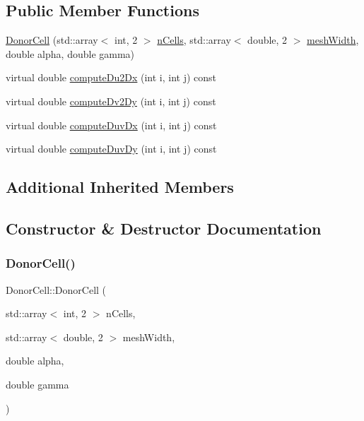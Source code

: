 \subsection*{Public Member Functions}
\begin{DoxyCompactItemize}
\item 
\mbox{\hyperlink{classDonorCell_acea7bc69414ae6534ffc93960e047704}{Donor\+Cell}} (std\+::array$<$ int, 2 $>$ \mbox{\hyperlink{classStaggeredGrid_af37816ccb2c46e4a514dedac261897bf}{n\+Cells}}, std\+::array$<$ double, 2 $>$ \mbox{\hyperlink{classStaggeredGrid_a330856d4efe952771daf0753ef84068e}{mesh\+Width}}, double alpha, double gamma)
\item 
virtual double \mbox{\hyperlink{classDonorCell_a191338f4c9d03f2fcf202ab865f28446}{compute\+Du2\+Dx}} (int i, int j) const
\item 
virtual double \mbox{\hyperlink{classDonorCell_a7b3026b85f60709b52742cb672af81c1}{compute\+Dv2\+Dy}} (int i, int j) const
\item 
virtual double \mbox{\hyperlink{classDonorCell_a15d34de5bfaf3ef3bb8713f7b5474b56}{compute\+Duv\+Dx}} (int i, int j) const
\item 
virtual double \mbox{\hyperlink{classDonorCell_a9255ed63d7d334c01be6204fcd457699}{compute\+Duv\+Dy}} (int i, int j) const
\end{DoxyCompactItemize}
\subsection*{Additional Inherited Members}


\subsection{Constructor \& Destructor Documentation}
\mbox{\label{classDonorCell_acea7bc69414ae6534ffc93960e047704}} 
\subsubsection{\texorpdfstring{DonorCell()}{DonorCell()}}
{\footnotesize\ttfamily Donor\+Cell\+::\+Donor\+Cell (\begin{DoxyParamCaption}\item[{std\+::array$<$ int, 2 $>$}]{n\+Cells,  }\item[{std\+::array$<$ double, 2 $>$}]{mesh\+Width,  }\item[{double}]{alpha,  }\item[{double}]{gamma }\end{DoxyParamCaption})}



